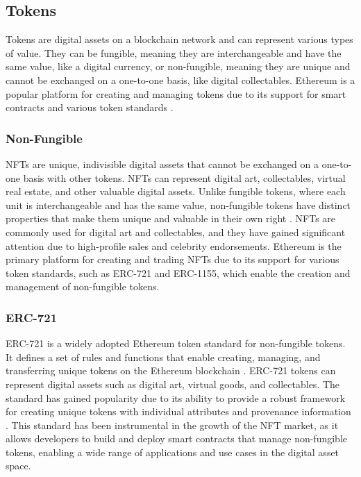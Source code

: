 \subsection{Tokens}
Tokens are digital assets on a blockchain network and can represent various types of value. They can be fungible, meaning they are interchangeable and have the same value, like a digital currency, or non-fungible, meaning they are unique and cannot be exchanged on a one-to-one basis, like digital collectables. Ethereum is a popular platform for creating and managing tokens due to its support for smart contracts and various token standards \cite{vogelsteller2015erc20}.

\subsubsection{Non-Fungible}
\ac{NFT}s are unique, indivisible digital assets that cannot be exchanged on a one-to-one basis with other tokens. \ac{NFT}s can represent digital art, collectables, virtual real estate, and other valuable digital assets. Unlike fungible tokens, where each unit is interchangeable and has the same value, non-fungible tokens have distinct properties that make them unique and valuable in their own right \cite{entriken2018erc721}. \ac{NFT}s are commonly used for digital art and collectables, and they have gained significant attention due to high-profile sales and celebrity endorsements. Ethereum is the primary platform for creating and trading \ac{NFT}s due to its support for various token standards, such as ERC-721 and ERC-1155, which enable the creation and management of non-fungible tokens.

\subsubsection{ERC-721}
ERC-721 is a widely adopted Ethereum token standard for non-fungible tokens. It defines a set of rules and functions that enable creating, managing, and transferring unique tokens on the Ethereum blockchain \cite{entriken2018erc721}. ERC-721 tokens can represent digital assets such as digital art, virtual goods, and collectables. The standard has gained popularity due to its ability to provide a robust framework for creating unique tokens with individual attributes and provenance information \cite{entriken2018erc721}. This standard has been instrumental in the growth of the \ac{NFT} market, as it allows developers to build and deploy smart contracts that manage non-fungible tokens, enabling a wide range of applications and use cases in the digital asset space.


